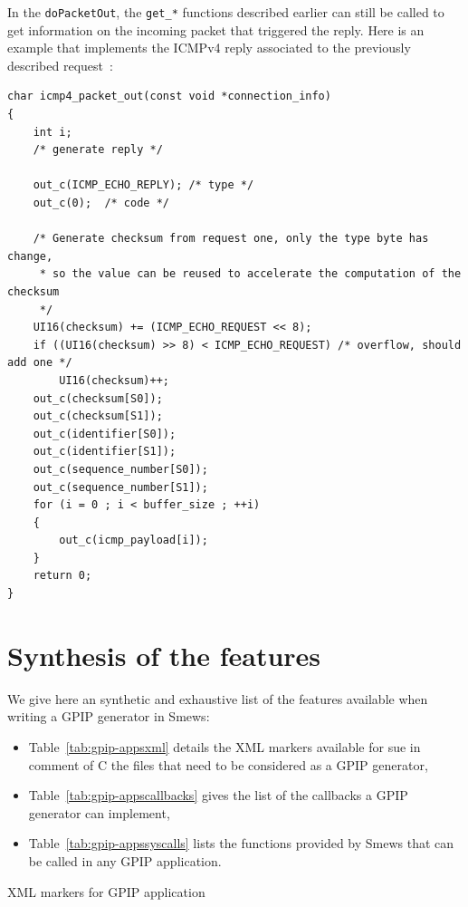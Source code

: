 \documentclass{report}
\newcommand{\rtab}[1]{Table~\ref{tab:#1}}
\begin{document}
In the \texttt{doPacketOut}, the \verb!get_*! functions described earlier can
still be called to get information on the incoming packet that triggered the
reply. Here is an example that implements the ICMPv4 reply associated to the
previously described request~:

\begin{lstlisting}
char icmp4_packet_out(const void *connection_info)
{
	int i;
	/* generate reply */

	out_c(ICMP_ECHO_REPLY); /* type */
	out_c(0);  /* code */

	/* Generate checksum from request one, only the type byte has change,
	 * so the value can be reused to accelerate the computation of the checksum
	 */
	UI16(checksum) += (ICMP_ECHO_REQUEST << 8);
	if ((UI16(checksum) >> 8) < ICMP_ECHO_REQUEST) /* overflow, should add one */
		UI16(checksum)++;
	out_c(checksum[S0]);
	out_c(checksum[S1]);
	out_c(identifier[S0]);
	out_c(identifier[S1]);
	out_c(sequence_number[S0]);
	out_c(sequence_number[S1]);
	for (i = 0 ; i < buffer_size ; ++i)
	{
		out_c(icmp_payload[i]);
	}
	return 0;
}
\end{lstlisting}


\section{Synthesis of the features}

We give here an synthetic and exhaustive list of the features available when writing a GPIP generator in Smews:

\begin{itemize}
\item \rtab{gpip-appsxml} details the XML markers available for sue in comment of C the files that need to be considered as a GPIP generator,
\item \rtab{gpip-appscallbacks} gives the list of the callbacks a GPIP generator can implement,
\item \rtab{gpip-appssyscalls} lists the functions provided by Smews that can be called in any GPIP application.
\end{itemize}

\begin{table}[htb]
\caption{XML markers for GPIP application}
\label{tab:gpip-appsxml}
\end{table}
\end{document}
